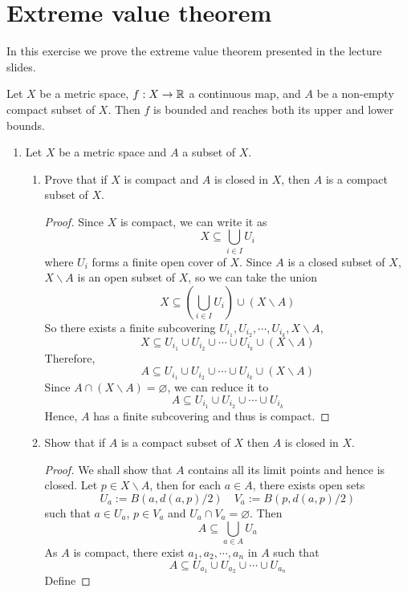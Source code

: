 \section{Extreme value theorem}
In this exercise we prove the extreme value theorem presented in the lecture slides.
\begin{theorem}
Let $X$ be a metric space, \(f:X \to\mathbb{R}\) a continuous map, and $A$ be a non-empty compact subset of $X$.
Then $f$ is bounded and reaches both its upper and lower bounds.
\end{theorem}
\begin{enumerate}
	\item Let $X$ be a metric space and $A$ a subset of $X$.
    \begin{enumerate}
    	\item Prove that if $X$ is compact and $A$ is closed in $X$, then $A$ is a compact subset of $X$.
        \begin{proof}
        Since $X$ is compact, we can write it as 
        \[ X\subseteq \bigcup_{i\in I}U_i \]
        where \(U_i\) forms a finite open cover of $X$.
		Since $A$ is a closed subset of $X$, \(X\backslash A\) is an open subset of $X$, so we can take the union
        \[ X\subseteq \left(\bigcup_{i\in I}U_i \right)\cup (X\backslash A)  \]
        So there exists a finite subcovering \(U_{i_1},U_{i_2},\cdots,U_{i_k},X\backslash A\),
        \[ X\subseteq U_{i_1}\cup U_{i_2}\cup \cdots\cup U_{i_k}\cup (X\backslash A) \]
        Therefore,
        \[ A\subseteq U_{i_1}\cup U_{i_2}\cup \cdots\cup U_{i_k}\cup (X\backslash A) \]
        Since \(A\cap (X\backslash A)=\varnothing\), we can reduce it to
        \[ A\subseteq U_{i_1}\cup U_{i_2}\cup \cdots\cup U_{i_k} \]
        Hence, $A$ has a finite subcovering and thus is compact.
        \end{proof}
        \item Show that if $A$ is a compact subset of $X$ then $A$ is closed in $X$.
        \begin{proof}
        We shall show that $A$ contains all its limit points and hence is closed.
        Let \(p\in X\backslash A\), then for each \(a\in A\), there exists open sets
        \[ U_a:=B(a,d(a,p)/2) \quad V_a:=B(p,d(a,p)/2) \]
        such that \(a\in U_a\), \(p\in V_a\) and \(U_a\cap V_a=\varnothing\).
        Then
        \[ A\subseteq \bigcup_{a\in A} U_a \]
        As $A$ is compact, there exist \(a_1,a_2,\cdots,a_n\) in $A$ such that
        \[ A\subseteq U_{a_1}\cup U_{a_2}\cup\cdots\cup U_{a_n} \]
        Define

\end{proof}
\end{enumerate}
\end{enumerate}
